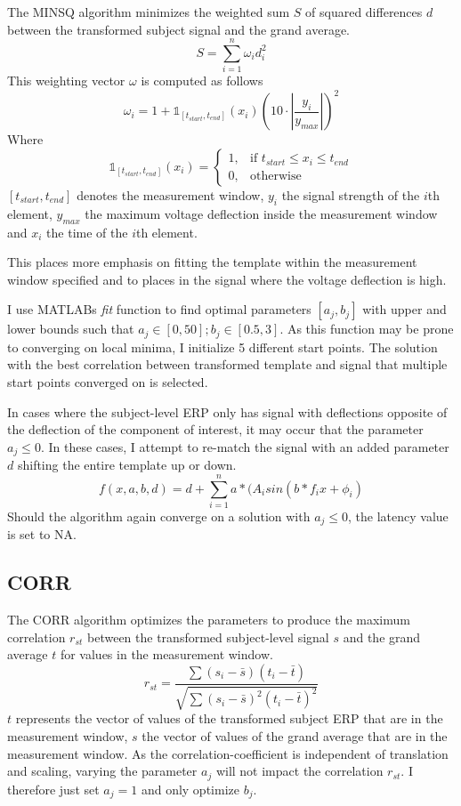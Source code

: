 \documentclass[
  man]{apa7}
\begin{document}
The MINSQ algorithm minimizes the weighted sum \(S\) of squared differences \(d\) between the transformed subject signal and the grand average.
\[S = \sum_{i = 1}^{n}\omega_{i}d_{i}^2\]
This weighting vector \(\omega\) is computed as follows
\[\omega_i = 1+\mathbb{1}_{[t_{start}, t_{end}]}(x_i)(10 \cdot |\frac{y_i}{y_{max}}|)^2\]
Where
\[\mathbb{1}_{[t_{start}, t_{end}]}(x_i) = \begin{cases} 1, & \text{if $t_{start} \le x_i \le t_{end}$} \\ 0, & \text{otherwise}\end{cases}\]\([t_{start}, t_{end}]\) denotes the measurement window, \(y_{i}\) the signal strength of the \(i\)th element, \(y_{max}\) the maximum voltage deflection inside the measurement window and \(x_i\) the time of the \(i\)th element.

This places more emphasis on fitting the template within the measurement window specified and to places in the signal where the voltage deflection is high.

I use MATLABs \emph{fit} function to find optimal parameters \([a_j, b_j]\) with upper and lower bounds such that \(a_j \in [0, 50]; b_j \in [0.5, 3]\). As this function may be prone to converging on local minima, I initialize 5 different start points. The solution with the best correlation between transformed template and signal that multiple start points converged on is selected.

In cases where the subject-level ERP only has signal with deflections opposite of the deflection of the component of interest, it may occur that the parameter \(a_j \le 0\). In these cases, I attempt to re-match the signal with an added parameter \(d\) shifting the entire template up or down.
\[f(x, a,b, d) = d +\sum_{i = 1}^{n} a*(A_isin(b*f_ix + \phi_i)\]
Should the algorithm again converge on a solution with \(a_j \le 0\), the latency value is set to NA.

\hypertarget{corr}{%
\subsection{CORR}\label{corr}}

The CORR algorithm optimizes the parameters to produce the maximum correlation \(r_{st}\) between the transformed subject-level signal \(s\) and the grand average \(t\) for values in the measurement window.
\[r_{st} = \frac{\sum(s_i - \bar{s})(t_{i} - \bar{t})}{\sqrt{\sum(s_i - \bar{s})^2(t_{i} - \bar{t})^2}}\]
\(t\) represents the vector of values of the transformed subject ERP that are in the measurement window, \(s\) the vector of values of the grand average that are in the measurement window. As the correlation-coefficient is independent of translation and scaling, varying the parameter \(a_j\) will not impact the correlation \(r_{st}\). I therefore just set \(a_j = 1\) and only optimize \(b_j\).
\end{document}
